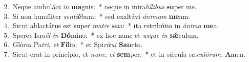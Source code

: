 {2.~}Neque ambulá\textit{vi} \textit{in} \textbf{ma}gnis:~* neque in mira\textit{bí}\textit{li}\textit{bus} \textbf{su}per me.\\
{3.~}Si non humíliter \textit{sen}\textit{ti}\textbf{é}bam:~* sed exaltávi \textit{á}\textit{ni}\textit{mam} \textbf{me}am.\\
{4.~}Sicut ablactátus est super \textit{ma}\textit{tre} \textbf{su}a:~* ita retribútio in \textit{á}\textit{ni}\textit{ma} \textbf{me}a.\\
{5.~}Speret Isra\textit{ël} \textit{in} \textbf{Dó}mino:~* ex hoc nunc et \textit{us}\textit{que} \textit{in} \textbf{sǽ}culum.\\
{6.~}Glória Pa\textit{tri}, \textit{et} \textbf{Fí}lio,~* et Spi\textit{rí}\textit{tu}\textit{i} \textbf{San}cto.\\
{7.~}Sicut erat in princípio, et \textit{nunc}, \textit{et} \textbf{sem}per,~* et in sǽcula sæ\textit{cu}\textit{ló}\textit{rum}. \textbf{A}men.\\
